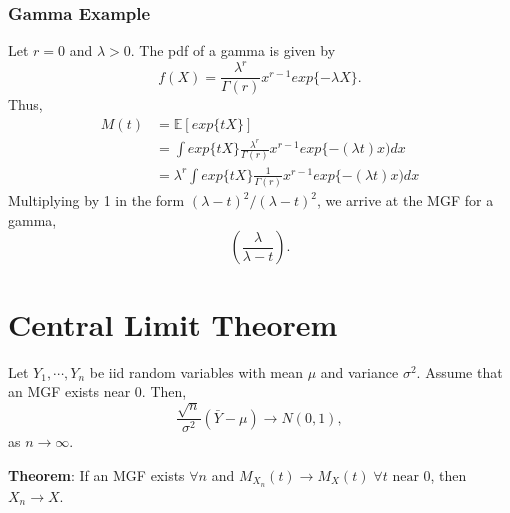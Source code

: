 \documentclass[titlepage, 12pt, leqno]{article}
\begin{document}
\subsubsection{Gamma Example}
Let $r=0$ and $\lambda >0$. The pdf of a gamma is given by
\[
    f(X) = \frac{\lambda^{r}}{\Gamma(r)}x^{r-1}exp\{-\lambda X\}.
\]
Thus,
\begin{align*}
    M(t)
    &= \mathbb{E}[exp\{tX\}] \\
    &= \int exp\{tX\} \frac{\lambda^{r}}{\Gamma(r)}x^{r-1}exp\{-(\lambda t)x) dx\\
    &= \lambda^{r} \int exp\{tX\} \frac{1}{\Gamma(r)}
    x^{r-1}exp\{-(\lambda t)x) dx
\end{align*}
Multiplying by 1 in the form $(\lambda - t)^{2} / (\lambda-t)^{2}$, 
we arrive at the MGF for a gamma,
\[
    \left(\frac{\lambda}{\lambda-t}\right).
\]
\pagebreak
\section{Central Limit Theorem}
Let $Y_{1}, \cdots , Y_{n}$ be iid random variables with mean $\mu$ and
variance $\sigma^{2}$. Assume that an MGF exists near 0. Then,
\[
\frac{\sqrt{n}}{\sigma^{2}}(\bar Y-\mu) \rightarrow N(0,1),
\]
as $n \rightarrow \infty$.

\begin{note}
    \textbf{Theorem}: If an MGF exists $\forall n$ and $M_{X_{n}}(t)
    \rightarrow M_{X}(t) \; \forall t \text{ near }0$, then 
    $X_{n} \rightarrow X$.
\end{note}
\end{document}

